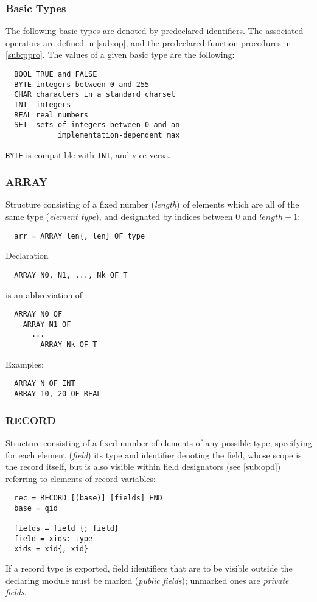 \subsubsection{Basic Types}
\label{sub:pre}
The following basic types are denoted by predeclared identifiers. The associated operators
are defined in \ref{sub:op}, and the predeclared function procedures in \ref{sub:ppro}.
The values of a given basic type are the following:
\begin{verbatim}
  BOOL TRUE and FALSE
  BYTE integers between 0 and 255
  CHAR characters in a standard charset
  INT  integers
  REAL real numbers
  SET  sets of integers between 0 and an
            implementation-dependent max
\end{verbatim}
\verb|BYTE| is compatible with \verb|INT|, and vice-versa.

\subsubsection{ARRAY}
Structure consisting of a fixed number (\emph{length}) of elements which are all of the
same type (\emph{element type}), and designated by indices between $0$ and $length - 1$:
\begin{verbatim}
  arr = ARRAY len{, len} OF type
\end{verbatim}
Declaration
\begin{verbatim}
  ARRAY N0, N1, ..., Nk OF T
\end{verbatim}
is an abbreviation of
\begin{verbatim}
  ARRAY N0 OF
    ARRAY N1 OF
      ...
        ARRAY Nk OF T
\end{verbatim}
Examples:
\begin{verbatim}
  ARRAY N OF INT
  ARRAY 10, 20 OF REAL
\end{verbatim}

\subsubsection{RECORD}
Structure consisting of a fixed number of elements of any possible type, specifying for
each element (\emph{field}) its type and identifier denoting the field, whose scope is
the record itself, but is also visible within field designators (see \ref{sub:opd})
referring to elements of record variables:
\begin{verbatim}
  rec = RECORD [(base)] [fields] END
  base = qid

  fields = field {; field}
  field = xids: type
  xids = xid{, xid}
\end{verbatim}
If a record type is exported, field identifiers that are to be visible outside the declaring
module must be marked (\emph{public fields}); unmarked ones are \emph{private fields}.

